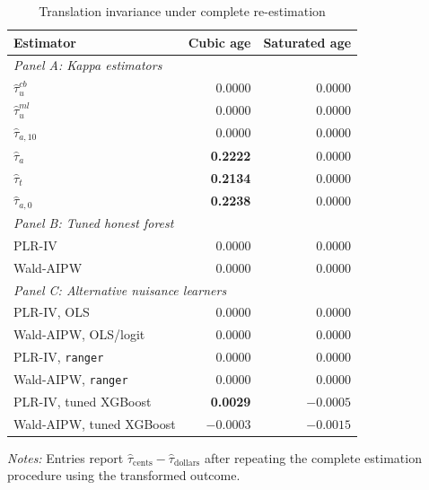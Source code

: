 \documentclass[12pt, a4paper, oneside]{article}
\theoremstyle{plain}
\theoremstyle{definition}
\begin{document}
\begin{table}[htbp]
\centering
\caption{Translation invariance under complete re-estimation}
\label{tab:vietnam_translation}
\footnotesize
\begin{threeparttable}
\begin{tabular}{@{}l rr@{}}
\toprule
Estimator
& Cubic age
& Saturated age \\
\midrule

\multicolumn{3}{l}{\textit{Panel A: Kappa estimators}} \\[2pt]

$\hat{\tau}_{u}^{cb}$
& 0.0000 & 0.0000 \\

$\hat{\tau}_{u}^{ml}$
& 0.0000 & 0.0000 \\

$\hat{\tau}_{a,10}$
& 0.0000 & 0.0000 \\

$\hat{\tau}_{a}$
& \textbf{0.2222} & 0.0000 \\

$\hat{\tau}_{t}$
& \textbf{0.2134} & 0.0000 \\

$\hat{\tau}_{a,0}$
& \textbf{0.2238} & 0.0000 \\[4pt]

\multicolumn{3}{l}{\textit{Panel B: Tuned honest forest}} \\[2pt]

PLR-IV
& 0.0000 & 0.0000 \\

Wald-AIPW
& 0.0000 & 0.0000 \\[4pt]

\multicolumn{3}{l}{\textit{Panel C: Alternative nuisance learners}} \\[2pt]

PLR-IV, OLS
& 0.0000 & 0.0000 \\

Wald-AIPW, OLS/logit
& 0.0000 & 0.0000 \\

PLR-IV, \texttt{ranger}
& 0.0000 & 0.0000 \\

Wald-AIPW, \texttt{ranger}
& 0.0000 & 0.0000 \\

PLR-IV, tuned XGBoost
& \textbf{0.0029} & $\mathbf{-0.0005}$ \\

Wald-AIPW, tuned XGBoost
& $\mathbf{-0.0003}$ & $\mathbf{-0.0015}$ \\

\bottomrule
\end{tabular}

\begin{tablenotes}
\footnotesize
\item \textit{Notes:} Entries report
\(\widehat{\tau}_{\mathrm{cents}}
-\widehat{\tau}_{\mathrm{dollars}}\)
after repeating the complete estimation procedure using the transformed
outcome.
\end{tablenotes}
\end{threeparttable}
\end{table}
\end{document}
